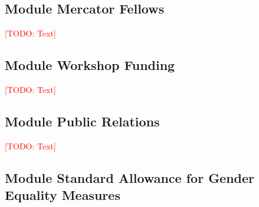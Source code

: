 \documentclass[american,firsttime]{dfgproposal}
\newcommand{\todo}[1]{\xspace{\textcolor{red}{[TODO: #1]}}\xspace}
\begin{document}
	\subsection{Module Mercator Fellows}
	\todo{Text}
	
	\subsection{Module Workshop Funding}
	\todo{Text}
	
	\subsection{Module Public Relations}
	\todo{Text}
	
	\subsection{Module Standard Allowance for Gender Equality Measures}
	
	
	
	
	
	
\end{document}
